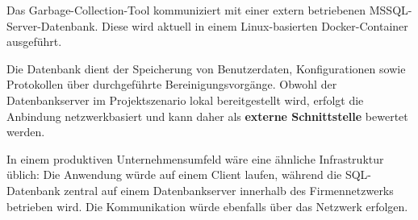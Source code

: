 Das Garbage-Collection-Tool kommuniziert mit einer extern betriebenen MSSQL-Server-Datenbank. Diese wird aktuell in einem Linux-basierten Docker-Container ausgeführt.

Die Datenbank dient der Speicherung von Benutzerdaten, Konfigurationen sowie Protokollen über durchgeführte Bereinigungsvorgänge. Obwohl der Datenbankserver im Projektszenario lokal bereitgestellt wird, erfolgt die Anbindung netzwerkbasiert und kann daher als \textbf{externe Schnittstelle} bewertet werden.

In einem produktiven Unternehmensumfeld wäre eine ähnliche Infrastruktur üblich: Die Anwendung würde auf einem Client laufen, während die SQL-Datenbank zentral auf einem Datenbankserver innerhalb des Firmennetzwerks betrieben wird. Die Kommunikation würde ebenfalls über das Netzwerk erfolgen.
